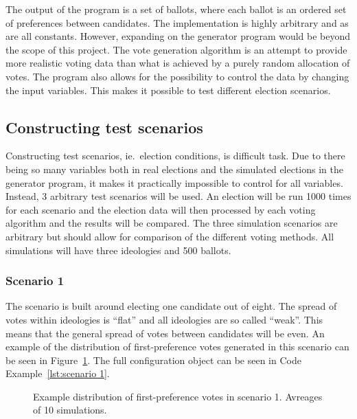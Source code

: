 \documentclass[12pt]{article}
\begin{document}
The output of the program is a set of ballots, where each ballot is an ordered set of preferences between candidates. The implementation is highly arbitrary and as are all constants. However, expanding on the generator program would be beyond the scope of this project. The vote generation algorithm is an attempt to provide more realistic voting data than what is achieved by a purely random allocation of votes. The program also allows for the possibility to control the data by changing the input variables. This makes it possible to test different election scenarios.
\subsection{Constructing test scenarios}
Constructing test scenarios, ie.\ election conditions, is difficult task. Due to there being so many variables both in real elections and the simulated elections in the generator program, it makes it practically impossible to control for all variables. Instead, 3 arbitrary test scenarios will be used. An election will be run 1000 times for each scenario and the election data will then processed by each voting algorithm and the results will be compared. The three simulation scenarios are arbitrary but should allow for comparison of the different voting methods. All simulations will have three ideologies and 500 ballots.
\subsubsection{Scenario 1}
\label{sec:method-scenario1}
The scenario is built around electing one candidate out of eight. The spread of votes within ideologies is ``flat'' and all ideologies are so called ``weak''. This means that the general spread of votes between candidates will be even. An example of the distribution of first-preference votes generated in this scenario can be seen in Figure~\ref{fig:example of scenario 1}. The full configuration object can be seen in Code Example~\ref{lst:scenario 1}.
\begin{figure}[H]
	\centering
	\caption{Example distribution of first-preference votes in scenario 1. Avreages of 10 simulations.}
\label{fig:example of scenario 1}
\end{figure}
\end{document}
